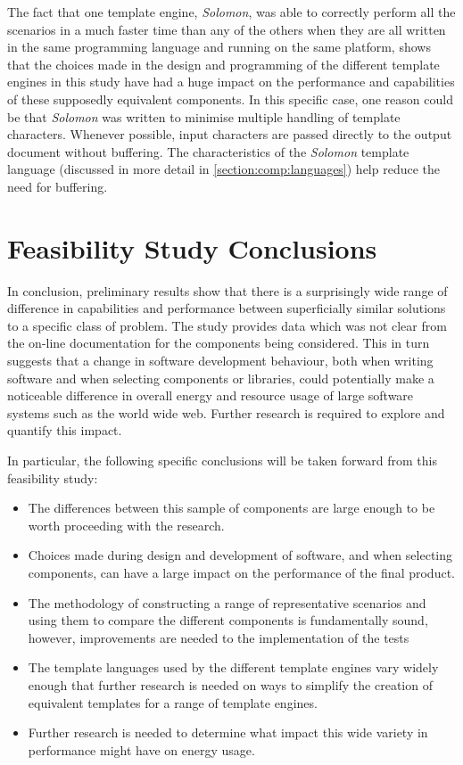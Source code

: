 The fact that one template engine, \emph{Solomon}, was able to correctly perform all the scenarios in a much faster time than any of the others when they are all written in the same programming language and running on the same platform, shows that the choices made in the design and programming of the different template engines in this study have had a huge impact on the performance and capabilities of these supposedly equivalent components. In this specific case, one reason could be that \emph{Solomon} was written to minimise multiple handling of template characters. Whenever possible, input characters are passed directly to the output document without buffering. The characteristics of the \emph{Solomon} template language (discussed in more detail in \autoref{section:comp:languages}) help reduce the need for buffering.

\section{Feasibility Study Conclusions}
\label{fs:conclusions}

In conclusion, preliminary results show that there is a surprisingly wide range of difference in capabilities and performance between superficially similar solutions to a specific class of problem. The study provides data which was not clear from the on-line documentation for the components being considered. This in turn suggests that a change in software development behaviour, both when writing software and when selecting components or libraries, could potentially make a noticeable difference in overall energy and resource usage of large software systems such as the world wide web. Further research is required to explore and quantify this impact.

In particular, the following specific conclusions will be taken forward from this feasibility study:

\begin{itemize}
\item The differences between this sample of components are large enough to be worth proceeding with the research.
\item Choices made during design and development of software, and when selecting components, can have a large impact on the performance of the final product.
\item The methodology of constructing a range of representative scenarios and using them to compare the different components is fundamentally sound, however, improvements are needed to the implementation of the tests
\item The template languages used by the different template engines vary widely enough that further research is needed on ways to simplify the creation of equivalent templates for a range of template engines.
\item Further research is needed to determine what impact this wide variety in performance might have on energy usage.
\end{itemize}

